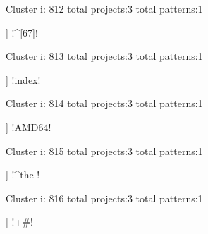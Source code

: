 Cluster i: 812
total projects:3
total patterns:1
\begin{multicols}{1}
\begin{description}[noitemsep,topsep=0pt]
\item [[3] ] \cverb!^[67]!
\end{description}
\end{multicols}







Cluster i: 813
total projects:3
total patterns:1
\begin{multicols}{1}
\begin{description}[noitemsep,topsep=0pt]
\item [[3] ] \cverb!index!
\end{description}
\end{multicols}







Cluster i: 814
total projects:3
total patterns:1
\begin{multicols}{1}
\begin{description}[noitemsep,topsep=0pt]
\item [[3] ] \cverb!AMD64!
\end{description}
\end{multicols}







Cluster i: 815
total projects:3
total patterns:1
\begin{multicols}{1}
\begin{description}[noitemsep,topsep=0pt]
\item [[3] ] \cverb!^the !
\end{description}
\end{multicols}







Cluster i: 816
total projects:3
total patterns:1
\begin{multicols}{1}
\begin{description}[noitemsep,topsep=0pt]
\item [[3] ] \cverb!\s+#!
\end{description}
\end{multicols}







